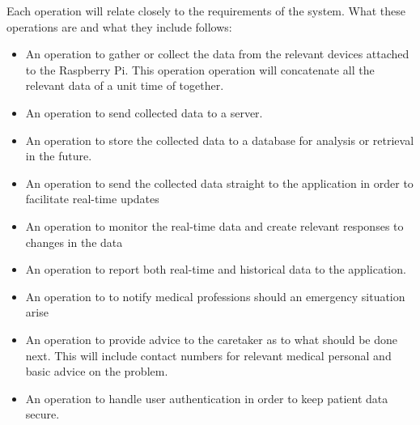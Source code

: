   Each operation will relate closely to the requirements of the system. What these operations are and what they include follows:
			\begin{itemize}
				           
            
            \item{An operation to gather or collect the data from the relevant 
            devices attached to the Raspberry Pi. This operation operation will concatenate all the relevant data of a unit time of together.}
            \item{An operation to send collected data to a server.}
            
            \item{An operation to store the collected data to a database for analysis or retrieval in the future.}
            
            \item{An operation to send the collected data straight to the application in order to facilitate real-time updates}
            
            \item{An operation to monitor the real-time data and create relevant responses to changes in the data}
            
            \item{An operation to report both real-time and historical data to the application.}
            
            \item{An operation to to notify medical professions should an emergency situation arise}
            
            \item{An operation to provide advice to the caretaker as to what should be done next. This will include contact numbers for relevant medical personal and basic advice on the problem.}
            
            \item{An operation to handle user authentication in order to keep patient data secure.}
            
\end{itemize}		